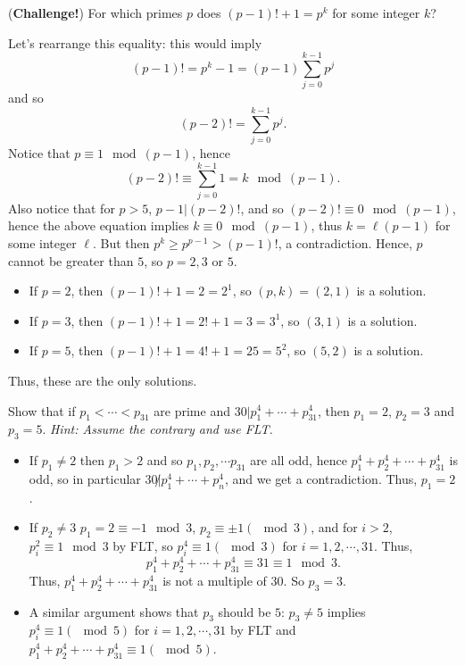 \documentclass[11pt,dvipsnames]{book}
\numberwithin{equation}{section} %
\numberwithin{figure}{section} %
\numberwithin{table}{section} %
\begin{document}
\begin{exercise}
\begin{exercise}
\end{exercise}


\begin{exercise} ({\bf Challenge!}) For which primes $p$ does $(p-1)!+1=p^{k}$ for some integer $k$?

\begin{solution}
Let's rearrange this equality: this would imply
\[
(p-1)! = p^{k}-1=(p-1)\sum_{j=0}^{k-1} p^{j}
\]
and so
\[
(p-2)! = \sum_{j=0}^{k-1} p^{j}.
\]
Notice that $p\equiv 1\mod (p-1)$, hence 
\[
(p-2)!\equiv \sum_{j=0}^{k-1} 1=k\mod (p-1).
\]
Also notice that for $p>5$, $p-1|(p-2)!$, and so $(p-2)!\equiv 0\mod (p-1)$, hence the above equation implies $k\equiv 0 \mod (p-1)$, thus $k=\ell(p-1)$ for some integer $\ell$. But then $p^{k}\geq p^{p-1}>(p-1)!$, a contradiction. Hence, $p$ cannot be greater than $5$, so $p=2,3$ or $5$.

\begin{itemize}
\item If $p=2$, then $(p-1)!+1=2=2^{1}$, so $(p,k)=(2,1)$ is a solution.
\item If $p=3$, then $(p-1)!+1=2!+1=3=3^{1}$, so $(3,1)$ is a solution.
\item If $p=5$, then $(p-1)!+1=4!+1=25=5^2$, so $(5,2)$ is a solution. 
\end{itemize}

Thus, these are the only solutions. 


\end{solution}


\end{exercise}


\begin{exercise} Show that if $p_{1}<\cdots < p_{31}$ are prime and $30|p_{1}^{4}+\cdots + p_{31}^{4}$, then $p_{1}=2$, $p_{2}=3$ and $p_{3}=5$. {\it Hint: Assume the contrary and use FLT.}

\begin{solution}

\begin{itemize}
\item  If $p_1\neq 2$ then $p_1>2$ and so $p_1,p_2,\cdots p_{31}$ are all odd, hence $p_1^4+p_2^4+\cdots+p_{31}^4$ is odd, so in particular $30\not| p_{1}^{4}+\cdots + p_{n}^{4}$, and we get a contradiction. Thus, $p_{1}=2$.

\item If $p_2\neq 3$ $p_{1}=2\equiv -1\mod 3$, $p_2\equiv \pm 1(\mod 3)$, and for $i>2$, $p_{i}^{2}\equiv 1\mod 3$ by FLT, so $p_i^{4}\equiv 1(\mod 3)$ for $i=1,2,\cdots,31$. Thus, 
\[
p_1^4+p_2^4+\cdots+p_{31}^4\equiv 31\equiv 1 \mod 3.
\]
Thus, $p_1^4+p_2^4+\cdots+p_{31}^4$ is not a multiple of $30$. So $p_3=3$. 
\item A similar argument shows that $p_3$ should be $5$: $p_3\neq 5 $ implies $ p_i^4\equiv 1 (\mod 5)$ for $i=1,2,\cdots,31$ by FLT and $p_1^4+p_2^4+\cdots+p_{31}^4\equiv 1 (\mod 5)$.
\end{itemize}
\end{solution}



\end{exercise}
\end{exercise}
\end{document}
